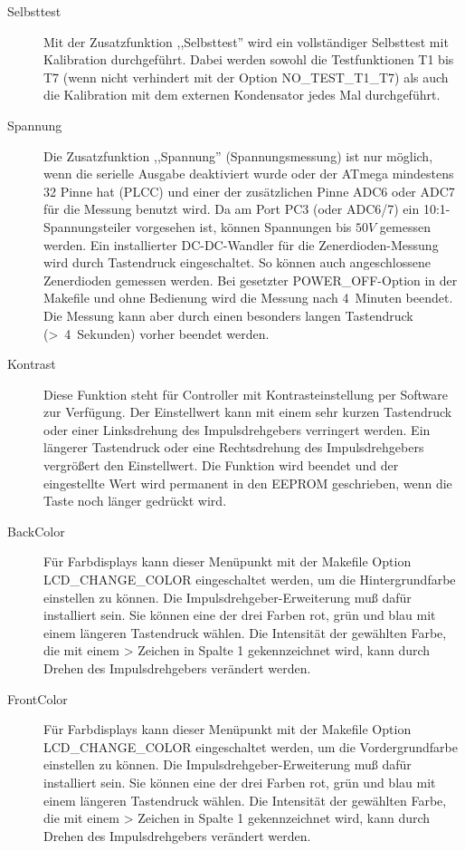 \begin{description}
 \item[Selbsttest]
Mit der Zusatzfunktion ,,Selbsttest'' wird ein vollständiger Selbsttest mit Kalibration durchgeführt.
Dabei werden sowohl die Testfunktionen T1 bis T7 (wenn nicht verhindert mit der Option NO\_TEST\_T1\_T7) 
als auch die Kalibration mit dem externen Kondensator jedes Mal durchgeführt.\\

 \item[Spannung]
Die Zusatzfunktion ,,Spannung'' (Spannungsmessung) ist nur möglich, wenn die serielle Ausgabe deaktiviert wurde
oder der ATmega mindestens 32 Pinne hat (PLCC) und einer der zusätzlichen Pinne ADC6 oder ADC7 für die Messung benutzt wird.
Da am Port PC3 (oder ADC6/7) ein 10:1-Spannungsteiler vorgesehen ist, können Spannungen bis \(50V\) gemessen werden.
Ein installierter DC-DC-Wandler für die Zenerdioden-Messung wird durch Tastendruck eingeschaltet.
So können auch angeschlossene Zenerdioden gemessen werden.
Bei gesetzter POWER\_OFF-Option in der Makefile und ohne Bedienung wird die Messung nach 4~Minuten beendet.
Die Messung kann aber durch einen besonders langen Tastendruck (\textgreater~4~Sekunden) vorher beendet werden.\\

\item[Kontrast] 
Diese Funktion steht für Controller mit Kontrasteinstellung per Software zur Verfügung.
Der Einstellwert kann mit einem sehr kurzen Tastendruck oder einer Linksdrehung des Impulsdrehgebers verringert werden.
Ein längerer Tastendruck oder eine Rechtsdrehung des Impulsdrehgebers vergrößert den Einstellwert.
Die Funktion wird beendet und der eingestellte Wert wird permanent in den EEPROM geschrieben, 
wenn die Taste noch länger gedrückt wird.

\item[BackColor]
Für Farbdisplays kann dieser Menüpunkt mit der Makefile Option LCD\_CHANGE\_COLOR eingeschaltet werden,
um die Hintergrundfarbe einstellen zu können. Die Impulsdrehgeber-Erweiterung muß dafür installiert sein.
Sie können eine der drei Farben rot, grün und blau mit einem längeren Tastendruck wählen.
Die Intensität der gewählten Farbe, die mit einem > Zeichen in Spalte 1 gekennzeichnet wird,
kann durch Drehen des Impulsdrehgebers verändert werden.

\item[FrontColor]
Für Farbdisplays kann dieser Menüpunkt mit der Makefile Option LCD\_CHANGE\_COLOR eingeschaltet werden,
um die Vordergrundfarbe einstellen zu können. Die Impulsdrehgeber-Erweiterung muß dafür installiert sein.
Sie können eine der drei Farben rot, grün und blau mit einem längeren Tastendruck wählen.
Die Intensität der gewählten Farbe, die mit einem > Zeichen in Spalte 1 gekennzeichnet wird,
kann durch Drehen des Impulsdrehgebers verändert werden.


\end{description}
